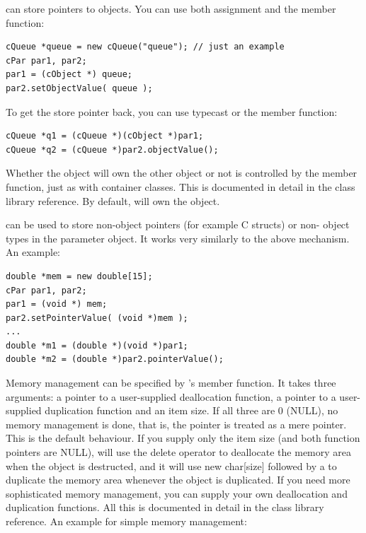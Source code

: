  can store pointers to {\opp} objects. You can use both 
assignment and the  member function:

\begin{Verbatim}
cQueue *queue = new cQueue("queue"); // just an example
cPar par1, par2;
par1 = (cObject *) queue;
par2.setObjectValue( queue );
\end{Verbatim}

To get the store pointer back, you can use typecast or the  
member function:

\begin{Verbatim}
cQueue *q1 = (cQueue *)(cObject *)par1;
cQueue *q2 = (cQueue *)par2.objectValue();
\end{Verbatim}


Whether the  object will own the other object or not is
controlled by the  member
function, just as with container classes. This is documented in detail
in the class library reference.  By default,  will own
the object.

 can be used to store non-object
pointers (for example C structs) or
non-{\opp} object types in the parameter object.  It works very
similarly to the above mechanism. An example:

\begin{Verbatim}
double *mem = new double[15];
cPar par1, par2;
par1 = (void *) mem;
par2.setPointerValue( (void *)mem );
...
double *m1 = (double *)(void *)par1;
double *m2 = (double *)par2.pointerValue();
\end{Verbatim}


Memory management can be specified by
's  member function. It takes
three arguments: a pointer to a user-supplied deallocation
function, a pointer to a user-supplied duplication function and
an item size. If all three are 0 (NULL), no memory management is done,
that is, the pointer is treated as a mere pointer. This is the default
behaviour. If you supply only the item size (and both function
pointers are NULL),  will use the delete operator to
deallocate the memory area when the  object is
destructed, and it will use new char[size] followed by a
 to duplicate the memory area whenever the
 object is duplicated. If you need more sophisticated
memory management, you can supply your own deallocation and
duplication functions.  All this is documented in detail in the class
library reference.  An example for simple memory management:

